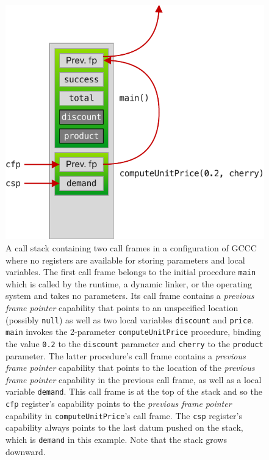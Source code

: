 \documentclass[main.tex]{subfiles}
\begin{document}
\begin{figure}
	\centering
	\includegraphics{Images/GCCC Stack.pdf}
	\caption{A call stack containing two call frames in a configuration of GCCC where no registers are available for storing parameters and local variables. The first call frame belongs to the initial procedure \texttt{main} which is called by the runtime, a dynamic linker, or the operating system and takes no parameters. Its call frame contains a \emph{previous frame pointer} capability that points to an unspecified location (possibly \texttt{null}) as well as two local variables \texttt{discount} and \texttt{price}. \texttt{main} invokes the 2-parameter \texttt{computeUnitPrice} procedure, binding the value \texttt{0.2} to the \texttt{discount} parameter and \texttt{cherry} to the \texttt{product} parameter. The latter procedure's call frame contains a \emph{previous frame pointer} capability that points to the location of the \emph{previous frame pointer} capability in the previous call frame, as well as a local variable \texttt{demand}. This call frame is at the top of the stack and so the \texttt{cfp} register's capability points to the \emph{previous frame pointer} capability in \texttt{computeUnitPrice}'s call frame. The \texttt{csp} register's capability always points to the last datum pushed on the stack, which is \texttt{demand} in this example. Note that the stack grows downward.}
	\label{fig:gcccstack}
\end{figure}
\end{document}
